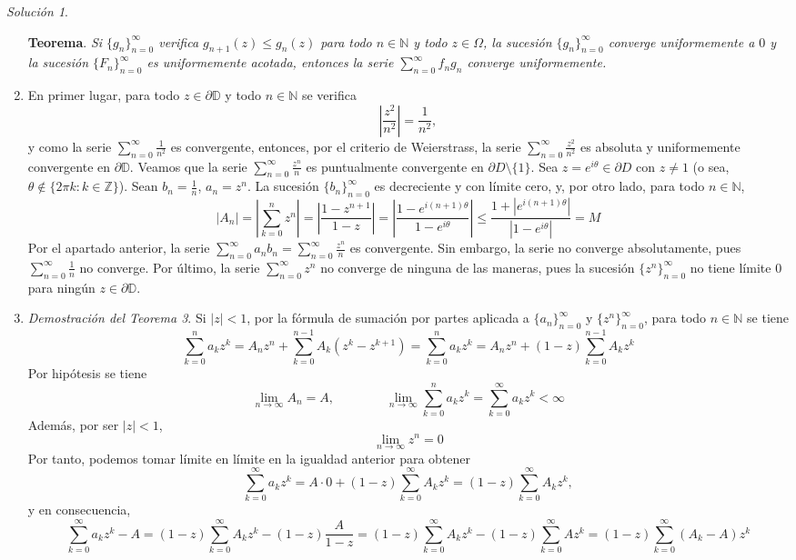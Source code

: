 \documentclass[11pt]{report}
\newcommand{\N}{\mathbb N}
\newcommand{\Z}{\mathbb Z}
\newcommand{\D}{\mathbb D}
\newcommand{\serie}[2][0]{\sum_{n=#1}^\infty #2}
\theoremstyle{remark}
\newtheorem*{resolution}{Solución}
\begin{document}
\begin{resolution}
\begin{enumerate}
    \textbf{Teorema}. \textit{Si $\{g_n\}_{n=0}^\infty$ verifica $g_{n+1}(z) \leq g_{n}(z)$ para todo $n \in \N$ y todo $z \in \Omega$, la sucesión $\{g_n\}_{n=0}^\infty$ converge uniformemente a $0$ y la sucesión $\{F_n\}_{n=0}^\infty$ es uniformemente acotada, entonces la serie $\sum_{n=0}^\infty f_ng_n$ converge uniformemente.}

    \item En primer lugar, para todo $z \in \partial \D$ y todo $n \in \N$ se verifica
    \[\left|\frac{z^2}{n^2}\right| =\frac{1}{n^2},\]
    y como la serie $\serie{\frac{1}{n^2}}$ es convergente, entonces, por el criterio de Weierstrass, la serie $\serie{\frac{z^2}{n^2}}$ es absoluta y uniformemente convergente en $\partial \D$. Veamos que la serie $\serie{\frac{z^n}{n}}$ es puntualmente convergente en $\partial D \setminus \{1\}$. Sea $z=e^{i\theta} \in \partial D$ con $z \neq 1$ (o sea, $\theta \not\in \{2\pi k \colon k \in \Z\}$). Sean $b_n = \frac{1}{n}$, $a_n = z^n$. La sucesión $\{b_n\}_{n=0}^\infty$ es decreciente y con límite cero, y, por otro lado, para todo $n \in \N$,
    \[\left|A_n\right| =\left|\sum_{k=0}^n z^n\right| = \left|\frac{1-z^{n+1}}{1-z}\right| = \left|\frac{1-e^{i(n+1)\theta}}{1-e^{i\theta}}\right| \leq \frac{1+|e^{i(n+1)\theta}|}{|1-e^{i\theta}|} = M\]
    Por el apartado anterior, la serie $\serie{a_nb_n} = \serie{\frac{z^n}{n}}$ es convergente. Sin embargo, la serie no converge absolutamente, pues $\serie{\frac{1}{n}}$ no converge. Por último, la serie $\serie{z^n}$ no converge de ninguna de las maneras, pues la sucesión $\{z^n\}_{n=0}^\infty$ no tiene límite $0$ para ningún $z \in \partial \D$.
    \item \textit{Demostración del Teorema 3}. Si $|z|<1$, por la fórmula de sumación por partes aplicada a $\{a_n\}_{n=0}^\infty$ y $\{z^n\}_{n=0}^\infty$, para todo $n \in \N$ se tiene
    \[\sum_{k=0}^n a_kz^k = A_nz^n+\sum_{k=0}^{n-1}A_k(z^k-z^{k+1}) = \sum_{k=0}^n a_kz^k = A_nz^n+(1-z)\sum_{k=0}^{n-1}A_kz^k\]
    Por hipótesis se tiene
    \[\lim_{n \to \infty} A_n = A, \qquad \qquad \lim_{n \to \infty} \sum_{k=0}^n a_kz^k = \sum_{k=0}^\infty a_kz^k < \infty\]
    Además, por ser $|z|<1$,
    \[\lim_{n \to \infty} z^n = 0\]
    Por tanto, podemos tomar límite en límite en la igualdad anterior para obtener
    \[\sum_{k=0}^\infty a_kz^k = A \cdot 0 +(1-z)\sum_{k=0}^\infty A_kz^k=(1-z)\sum_{k=0}^\infty A_kz^k,\]
    y en consecuencia,
    \[
    \sum_{k=0}^\infty a_kz^k-A = (1-z)\sum_{k=0}^\infty A_kz^k-(1-z)\frac{A}{1-z} = (1-z)\sum_{k=0}^\infty A_kz^k-(1-z)\sum_{k=0}^\infty Az^k= (1-z)\sum_{k=0}^\infty (A_k-A)z^k\]

\end{enumerate}
\end{resolution}
\end{document}
